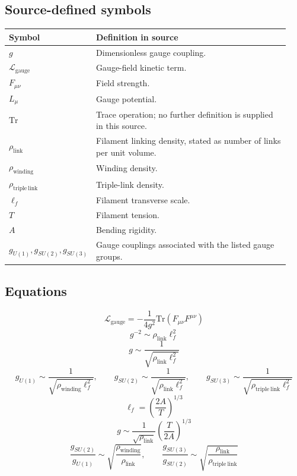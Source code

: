 \documentclass[11pt]{article}
\begin{document}
\subsection*{Source-defined symbols}
\small
\begin{longtable}{L{0.24\linewidth}L{0.70\linewidth}}
\toprule
\textbf{Symbol} & \textbf{Definition in source}\\
\midrule
\endhead
$g$ & Dimensionless gauge coupling.\\
$\mathcal{L}_{\mathrm{gauge}}$ & Gauge-field kinetic term.\\
$F_{\mu\nu}$ & Field strength.\\
$L_\mu$ & Gauge potential.\\
$\mathrm{Tr}$ & Trace operation; no further definition is supplied in this source.\\
$\rho_{\mathrm{link}}$ & Filament linking density, stated as number of links per unit volume.\\
$\rho_{\mathrm{winding}}$ & Winding density.\\
$\rho_{\mathrm{triple\ link}}$ & Triple-link density.\\
$\ell_f$ & Filament transverse scale.\\
$T$ & Filament tension.\\
$A$ & Bending rigidity.\\
$g_{U(1)},g_{SU(2)},g_{SU(3)}$ & Gauge couplings associated with the listed gauge groups.\\
\bottomrule
\end{longtable}
\normalsize

\subsection*{Equations}
\begin{equation*}
 \mathcal{L}_{\mathrm{gauge}}=-\frac{1}{4g^2}\mathrm{Tr}(F_{\mu\nu}F^{\mu\nu})
\end{equation*}
\begin{equation*}
 g^{-2}\sim\rho_{\mathrm{link}}\ell_f^2
\end{equation*}
\begin{equation*}
 g\sim\frac{1}{\sqrt{\rho_{\mathrm{link}}\ell_f^2}}
\end{equation*}
\begin{equation*}
 g_{U(1)}\sim\frac{1}{\sqrt{\rho_{\mathrm{winding}}\ell_f^2}},\qquad
 g_{SU(2)}\sim\frac{1}{\sqrt{\rho_{\mathrm{link}}\ell_f^2}},\qquad
 g_{SU(3)}\sim\frac{1}{\sqrt{\rho_{\mathrm{triple\ link}}\ell_f^2}}
\end{equation*}
\begin{equation*}
 \ell_f=\left(\frac{2A}{T}\right)^{1/3}
\end{equation*}
\begin{equation*}
 g\sim\frac{1}{\sqrt{\rho_{\mathrm{link}}}}
 \left(\frac{T}{2A}\right)^{1/3}
\end{equation*}
\begin{equation*}
 \frac{g_{SU(2)}}{g_{U(1)}}\sim\sqrt{\frac{\rho_{\mathrm{winding}}}{\rho_{\mathrm{link}}}},\qquad
 \frac{g_{SU(3)}}{g_{SU(2)}}\sim\sqrt{\frac{\rho_{\mathrm{link}}}{\rho_{\mathrm{triple\ link}}}}
\end{equation*}
\end{document}
